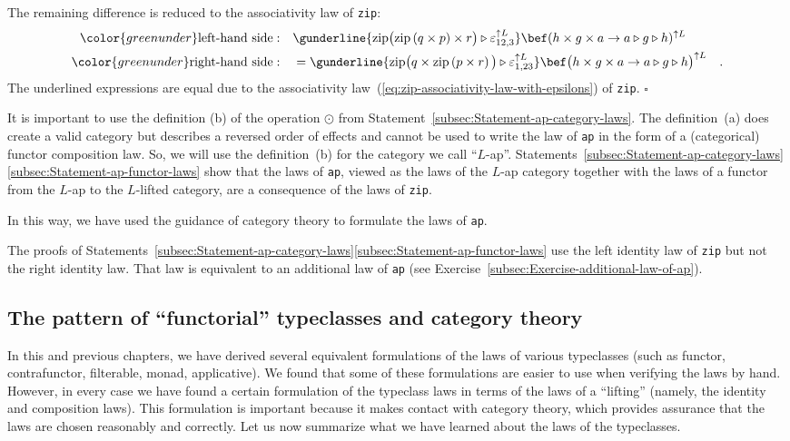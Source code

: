The remaining difference is reduced to the associativity law of \lstinline!zip!:
\begin{align*}
{\color{greenunder}\text{left-hand side}:}\quad & \gunderline{\text{zip}\big(\text{zip}\left(q\times p\right)\times r\big)\triangleright\varepsilon_{12,3}^{\uparrow L}}\bef(h\times g\times a\rightarrow a\triangleright g\triangleright h)^{\uparrow L}\\
{\color{greenunder}\text{right-hand side}:}\quad & =\gunderline{\text{zip}\big(q\times\text{zip}\left(p\times r\right)\big)\triangleright\varepsilon_{1,23}^{\uparrow L}}\bef\big(h\times g\times a\rightarrow a\triangleright g\triangleright h\big)^{\uparrow L}\quad.
\end{align*}
The underlined expressions are equal due to the associativity law~(\ref{eq:zip-associativity-law-with-epsilons})
of \lstinline!zip!. $\square$

It is important to use the definition (b) of the operation $\odot$
from Statement~\ref{subsec:Statement-ap-category-laws}. The definition~(a)
does create a valid category but describes a reversed order of effects
and cannot be used to write the law of \lstinline!ap! in the form
of a (categorical) functor composition law. So, we will use the definition~(b)
for the category we call \textsf{``}$L$-ap\textsf{''}. Statements~\ref{subsec:Statement-ap-category-laws}\textendash \ref{subsec:Statement-ap-functor-laws}
show that the laws of \lstinline!ap!, viewed as the laws of the $L$-ap
category together with the laws of a functor from the $L$-ap to the
$L$-lifted category, are a consequence of the laws of \lstinline!zip!.

In this way, we have used the guidance of category theory to formulate
the laws of \lstinline!ap!.

The proofs of Statements~\ref{subsec:Statement-ap-category-laws}\textendash \ref{subsec:Statement-ap-functor-laws}
use the left identity law of \lstinline!zip! but not the right identity
law. That law is equivalent to an additional law of \lstinline!ap!
(see Exercise~\ref{subsec:Exercise-additional-law-of-ap}).

\subsection{The pattern of \textquotedblleft functorial\textquotedblright{} typeclasses
and category theory\label{subsec:The-pattern-of-functorial-typeclasses}}

In this and previous chapters, we have derived several equivalent
formulations of the laws of various typeclasses (such as functor,
contrafunctor, filterable, monad, applicative). We found that some
of these formulations are easier to use when verifying the laws by
hand. However, in every case we have found a certain formulation of
the typeclass laws in terms of the laws of a \textsf{``}lifting\textsf{''} (namely,
the identity and composition laws). This formulation is important
because it makes contact with category theory, which provides assurance
that the laws are chosen reasonably and correctly. Let us now summarize
what we have learned about the laws of the typeclasses.

